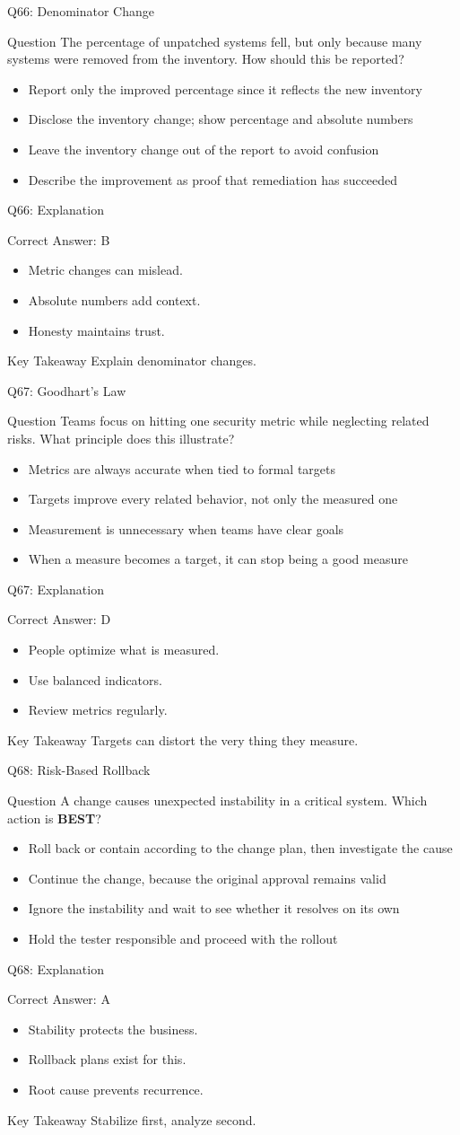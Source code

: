 \documentclass[aspectratio=169]{beamer}
\newcommand{\hq}[7]{%
	\begin{frame}{Q#1: #2}
		\begin{block}{Question}
			#3
		\end{block}
		\begin{itemize}
			#4
		\end{itemize}
	\end{frame}
	\begin{frame}{Q#1: Explanation}
		\begin{block}{Correct Answer: #5}
			\begin{itemize}
				#6
			\end{itemize}
		\end{block}
		\begin{alertblock}{Key Takeaway}
			#7
		\end{alertblock}
	\end{frame}
}
\begin{document}
	\hq{66}{Denominator Change}
	{The percentage of unpatched systems fell, but only because many systems were removed from the inventory. How should this be reported?}
	{\item[\textbf{(A)}] Report only the improved percentage since it reflects the new inventory
		\item[\textbf{(B)}] Disclose the inventory change; show percentage and absolute numbers
		\item[\textbf{(C)}] Leave the inventory change out of the report to avoid confusion
		\item[\textbf{(D)}] Describe the improvement as proof that remediation has succeeded}
	{B}
	{\item Metric changes can mislead.
		\item Absolute numbers add context.
		\item Honesty maintains trust.}
	{Explain denominator changes.}

	\hq{67}{Goodhart's Law}
	{Teams focus on hitting one security metric while neglecting related risks. What principle does this illustrate?}
	{\item[\textbf{(A)}] Metrics are always accurate when tied to formal targets
		\item[\textbf{(B)}] Targets improve every related behavior, not only the measured one
		\item[\textbf{(C)}] Measurement is unnecessary when teams have clear goals
		\item[\textbf{(D)}] When a measure becomes a target, it can stop being a good measure}
	{D}
	{\item People optimize what is measured.
		\item Use balanced indicators.
		\item Review metrics regularly.}
	{Targets can distort the very thing they measure.}

	\hq{68}{Risk-Based Rollback}
	{A change causes unexpected instability in a critical system. Which action is \textbf{BEST}?}
	{\item[\textbf{(A)}] Roll back or contain according to the change plan, then investigate the cause
		\item[\textbf{(B)}] Continue the change, because the original approval remains valid
		\item[\textbf{(C)}] Ignore the instability and wait to see whether it resolves on its own
		\item[\textbf{(D)}] Hold the tester responsible and proceed with the rollout}
	{A}
	{\item Stability protects the business.
		\item Rollback plans exist for this.
		\item Root cause prevents recurrence.}
	{Stabilize first, analyze second.}
\end{document}

